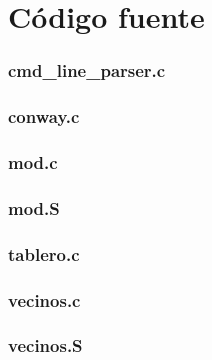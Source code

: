 \clearpage
\section{Código fuente}\label{appendix_codigo_fuente}

\subsubsection{cmd\_line\_parser.c}\label{app_cmd_line_parser}

\clearpage

\subsubsection{conway.c}\label{app_main}

\clearpage

\subsubsection{mod.c}\label{app_mod}

\clearpage

\subsubsection{mod.S}\label{app_mod_s}

\clearpage

\subsubsection{tablero.c}\label{app_tablero}

\clearpage

\subsubsection{vecinos.c}\label{app_vecinos}

\clearpage

\subsubsection{vecinos.S}\label{app_vecinos_s}

\clearpage


